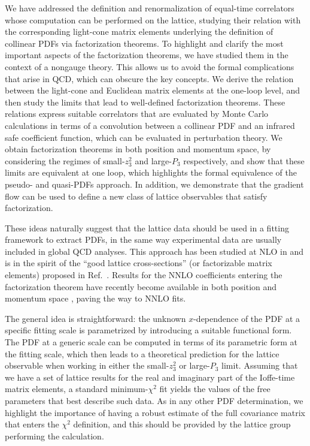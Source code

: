 We have addressed the definition and renormalization of equal-time
correlators whose computation can be performed on the lattice, studying their
relation with the corresponding light-cone matrix elements underlying the
definition of collinear PDFs via factorization theorems.
%
To highlight and clarify the most important aspects of the factorization
theorems, we have studied them in the context of a nongauge theory. This allows
us to avoid the formal complications that arise in QCD, which can obscure the key concepts. 
%
We derive the relation between the light-cone and Euclidean matrix
elements at the one-loop level, and then study the limits that lead to well-defined
factorization theorems. These relations express suitable correlators that are evaluated by
Monte Carlo calculations in terms of a convolution between a collinear PDF and an
infrared safe coefficient function, which can be evaluated in perturbation
theory. We obtain factorization theorems in both position and momentum
space, by considering the regimes of small-$z_3^2$ and large-$P_3$ respectively, and
show that these limits are equivalent at one loop, which highlights the formal
equivalence of the pseudo- and quasi-PDFs approach. In addition, we demonstrate that
 the gradient flow can be used to define a new class of lattice observables that satisfy factorization.


These ideas naturally suggest that the lattice data should be used in a fitting framework to extract
PDFs, in the same way experimental data are usually included in global QCD
analyses. This approach has been studied at NLO in
\cite{Karpie:2019eiq,Cichy:2019ebf} and is in the spirit of the ``good lattice
cross-sections'' (or factorizable matrix elements) proposed in
Ref.~\cite{Ma:2017pxb,Ma:2014jla}. Results for the NNLO coefficients entering the factorization theorem have recently become available
in both position and momentum space \cite{Li:2020xml, Chen:2020ody, Braun:2020ymy, Chen:2020arf, Chen:2020iqi}, paving the way to NNLO fits.
 
The general idea is straightforward: the unknown $x$-dependence of the PDF at a
specific fitting scale is parametrized by introducing a suitable functional
form. The PDF at a generic scale can be computed in terms of its parametric form
at the fitting scale, which then leads to a theoretical prediction for the
lattice observable when working in either the small-$z_3^2$ or large-$P_3$
limit. Assuming that we have a set of lattice results for the real and imaginary
part of the Ioffe-time matrix elements, a standard minimum-$\chi^2$ fit yields
the values of the free parameters that best describe such data. As in any other
PDF determination, we highlight the importance of having a robust estimate of
the full covariance matrix that enters the $\chi^2$ definition, and this should
be provided by the lattice group performing the calculation.
 
